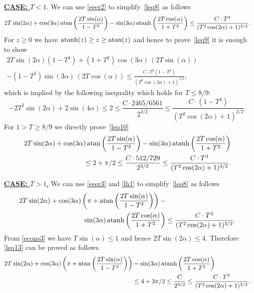 \documentclass[11pt]{article}
\def\({\left(} \def\){\right)} \def\hatU{\widehat{U}}
\begin{document}
\vskip 0.2cm
\underline{{\bf CASE: $T<1$}}. We can use \eqref{eeer2} to simplify~\eqref{leq8} as follows
\begin{equation}\label{leq9}
\begin{split}
2T\sin(2\alpha)+
\cos(3\alpha)\,{\rm atan}\(\frac{2T\sin(\alpha)}{1-T^2}\)
-\sin(3\alpha)\,{\rm atanh}\(\frac{2T\cos(\alpha)}{1+T^2}\)
\leq \frac{C\cdot T^3}{(T^2\cos(2\alpha)+1)^{3/2}}.
\end{split}
\end{equation}
For $z\geq 0$ we have ${\rm atanh}(z)\geq z\geq{\rm atan}(z)$ and hence to prove~\eqref{leq9}
it is enough to show
\begin{equation}\label{leq10}
\begin{split}
2T\sin(2\alpha)(1-T^4)+
(1+T^2)\cos(3\alpha)\,\(2T\sin(\alpha)\)\phantom{XXXXXXXXX}\\
-(1-T^2)\sin(3\alpha)\,\(2T\cos(\alpha)\)
\leq \frac{C\cdot T^3(1-T^4)}{(T^2\cos(2\alpha)+1)^{3/2}},
\end{split}
\end{equation}
which is implied by the following inequality which holds for $T\leq 8/9$:
\begin{equation}\label{leq11}
-2T^2\sin(2\alpha)+2\sin(4\alpha)
\leq 2 \leq \frac{C\cdot 2465/6561}{2^{3/2}} \leq \frac{C\cdot (1-T^4)}{(T^2\cos(2\alpha)+1)^{3/2}}.
\end{equation}
For $1>T\geq 8/9$ we directly prove~\eqref{leq10}
\begin{equation*}\label{leq12}
\begin{split}
2T\sin(2\alpha)+
\cos(3\alpha)\,{\rm atan}\(\frac{2T\sin(\alpha)}{1-T^2}\)
-\sin(3\alpha)\,{\rm atanh}\(\frac{2T\cos(\alpha)}{1+T^2}\)\\
\leq 2+\pi/2 \leq \frac{C\cdot 512/729}{2^{3/2}} \leq \frac{C\cdot T^3}{(T^2\cos(2\alpha)+1)^{3/2}}.
\end{split}
\end{equation*}

\underline{{\bf CASE: $T>1$}.} We can use \eqref{eeer3} and \eqref{lh1} to simplify~\eqref{leq8} as follows
\begin{equation}\label{leq13}
\begin{split}
2T\sin(2\alpha)+
\cos(3\alpha)\(\pi+{\rm atan}\(\frac{2T\sin(\alpha)}{1-T^2}\)\)
-\phantom{XXXXXXXXXXX}\\
\sin(3\alpha)\,{\rm atanh}\(\frac{2T\cos(\alpha)}{1+T^2}\)
\leq \frac{C\cdot T^3}{(T^2\cos(2\alpha)+1)^{3/2}}.
\end{split}
\end{equation}
From \eqref{econs3} we have $T\sin(\alpha)\leq 1$ and hence $2T\sin(2\alpha)\leq 4$. Therefore
\eqref{leq13} can be proved as follows.
\begin{equation*}\label{leq14}
\begin{split}
2T\sin(2\alpha)+
\cos(3\alpha)\(\pi+{\rm atan}\(\frac{2T\sin(\alpha)}{1-T^2}\)\)
-\sin(3\alpha)\,{\rm atanh}\(\frac{2T\cos(\alpha)}{1+T^2}\)\phantom{XXXXXX}\\
\leq 4+3\pi/2\leq \frac{C}{2^{3/2}}\leq\frac{C\cdot T^3}{(T^2\cos(2\alpha)+1)^{3/2}}.
\end{split}
\end{equation*}
\end{document}
